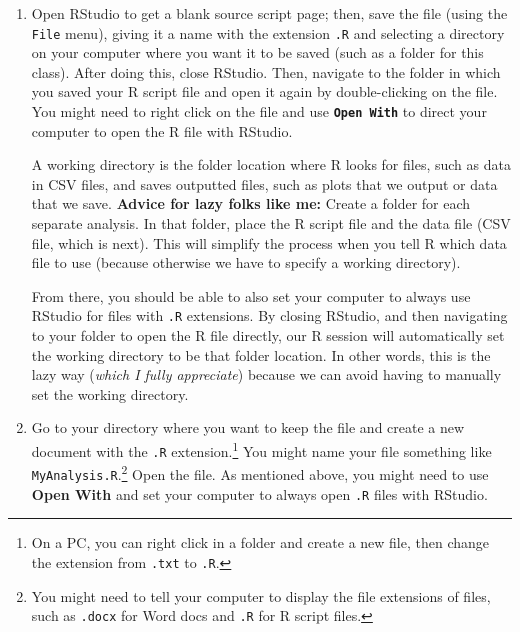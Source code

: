 \documentclass[]{tufte-handout}
\begin{document}
\begin{enumerate}
\def\labelenumi{\arabic{enumi}.}
\item
  Open RStudio to get a blank source script page; then, save the file
  (using the \texttt{File} menu), giving it a name with the extension
  \texttt{.R} and selecting a directory on your computer where you want
  it to be saved (such as a folder for this class). After doing this,
  close RStudio. Then, navigate to the folder in which you saved your R
  script file and open it again by double-clicking on the file. You
  might need to right click on the file and use
  \textbf{\texttt{Open\ With}} to direct your computer to open the R
  file with RStudio.

  \begin{marginfigure}
  A working directory is the folder location where R looks for files, such
  as data in CSV files, and saves outputted files, such as plots that we
  output or data that we save. \textbf{Advice for lazy folks like me:}
  Create a folder for each separate analysis. In that folder, place the R
  script file and the data file (CSV file, which is next). This will
  simplify the process when you tell R which data file to use (because
  otherwise we have to specify a working directory).
  \end{marginfigure}

  From there, you should be able to also set your computer to always use
  RStudio for files with \texttt{.R} extensions. By closing RStudio, and
  then navigating to your folder to open the R file directly, our R
  session will automatically set the working directory to be that folder
  location. In other words, this is the lazy way (\emph{which I fully
  appreciate}) because we can avoid having to manually set the working
  directory.
\item
  Go to your directory where you want to keep the file and create a new
  document with the \texttt{.R} extension.\footnote{On a PC, you can
    right click in a folder and create a new file, then change the
    extension from \texttt{.txt} to \texttt{.R}.} You might name your
  file something like \texttt{MyAnalysis.R}.\footnote{You might need to
    tell your computer to display the file extensions of files, such as
    \texttt{.docx} for Word docs and \texttt{.R} for R script files.}
  Open the file. As mentioned above, you might need to use \textbf{Open
  With} and set your computer to always open \texttt{.R} files with
  RStudio.
\end{enumerate}
\end{document}
